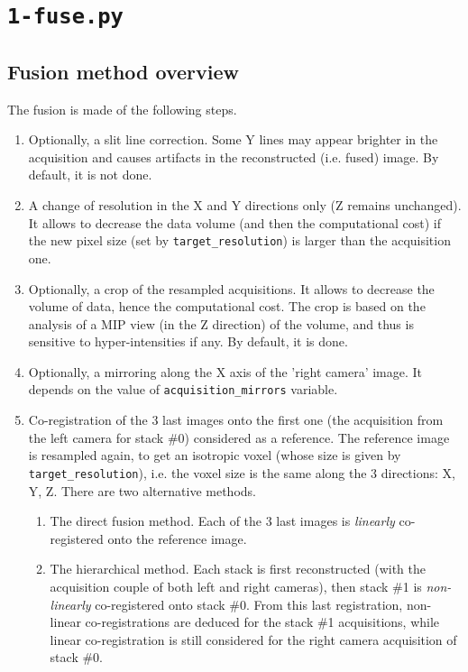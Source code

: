 \section{\texttt{1-fuse.py}}
\label{sec:cli:fuse}

\subsection{Fusion method overview}

The fusion is made of the following steps.
\begin{enumerate}
\itemsep -0.5ex
\item \label{it:fusion:slit:line} Optionally, a slit line correction. Some Y lines may appear brighter in the acquisition and causes artifacts in the reconstructed (i.e. fused) image. By default, it is not done.

\item A change of resolution in the X and Y directions only (Z remains unchanged). It allows to decrease the data volume (and then the computational cost) if the new pixel size (set by \verb|target_resolution|) is larger than the acquisition one.

\item \label{it:fusion:crop:1} Optionally, a crop of the resampled acquisitions. It allows to decrease the volume of data, hence the computational cost. The crop is based on the analysis of a MIP view (in the Z direction) of  the volume, and thus is sensitive to hyper-intensities if any. By default, it is done.

\item Optionally, a mirroring along the X axis of the 'right camera' image. It depends on the value of  \verb|acquisition_mirrors| variable.

\item \label{it:fusion:registration} Co-registration of the 3 last images onto the first one (the acquisition from the left camera for stack \#0) considered as a reference. The reference image is resampled again, to get an isotropic voxel (whose size is given by \verb|target_resolution|), i.e. the voxel size is the same along the 3 directions: X, Y, Z. There are two alternative methods.
\begin{enumerate}
\itemsep -0.5ex
\item The direct fusion method. Each of the  3 last images is \textit{linearly} co-registered onto the reference image.
\item The hierarchical method. Each stack is first reconstructed (with the acquisition couple of both left and right cameras), then stack \#1 is \textit{non-linearly} co-registered onto stack \#0. From this last registration, non-linear co-registrations are deduced for the stack \#1 acquisitions, while linear co-registration is still considered for the right camera acquisition of stack \#0.
\end{enumerate}


\end{enumerate}
